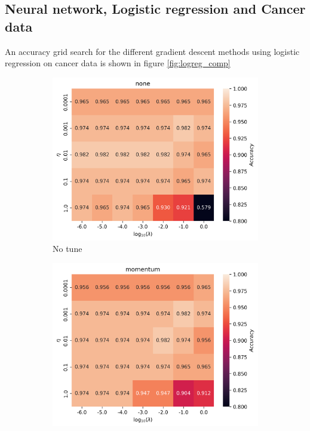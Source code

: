 \documentclass[11pt]{article}
\begin{document}
\subsection{Neural network, Logistic regression and Cancer data}
An accuracy grid search for the different gradient descent methods using logistic regression on cancer data is shown in figure \ref{fig:logreg_comp}
\begin{figure}[H]
  \begin{subfigure}{.5\textwidth}
    \centering
    \includegraphics[width=.95\textwidth]{../figures/logreg_none.png}
    \caption{No tune}
    \label{fig:}
  \end{subfigure}
  \begin{subfigure}{.5\textwidth}
    \centering
    \includegraphics[width=.95\textwidth]{../figures/logreg_momentum.png}

\end{subfigure}
\end{figure}
\end{document}
